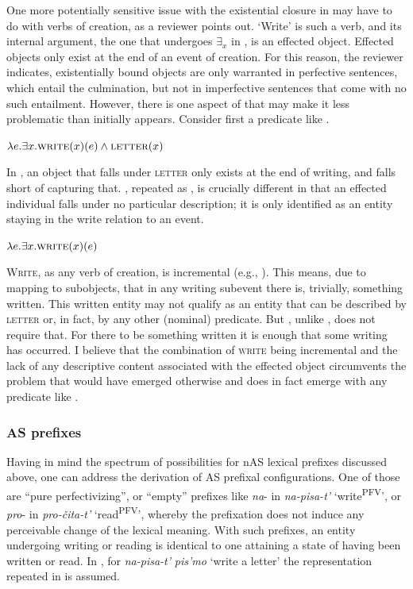\documentclass[output=paper,colorlinks,citecolor=brown]{langscibook}
\begin{document}
One more potentially sensitive issue with the existential closure in  may have to do with verbs of creation, as a reviewer points out. ‘Write’ is such a verb, and its internal argument, the one that undergoes $\exists_x$ in , is an effected object. Effected objects only exist at the end of an event of creation. For this reason, the reviewer indicates, existentially bound objects are only warranted in perfective sentences, which entail the culmination, but not in imperfective sentences that come with no such entailment. However, there is one aspect of  that may make it less problematic than initially appears. Consider first a predicate like .

\ea\label{ex:tatevosov:ifn33}
$\lambda e.\exists x.\textsc{write}(x)(e) \wedge \textsc{letter}(x)$ 
\z

\noindent In , an object that falls under \textsc{letter} only exists at the end of writing, and  falls short of capturing that. , repeated as , is crucially different in that an effected individual falls under no particular description; it is only identified as an entity staying in the write relation to an event.

\ea\label{ex:tatevosov:iifn33}
$\lambda e.\exists x.\textsc{write}(x)(e)$
\z

\noindent \textsc{Write}, as any verb of creation, is incremental (e.g., \citealt{Pinon2008}). This means, due to mapping to subobjects, that in any writing subevent there is, trivially, something written. This written entity may not qualify as an entity that can be described by \textsc{letter} or, in fact, by any other (nominal) predicate. But , unlike , does not require that. For there to be something written it is enough that some writing has occurred. I believe that the combination of \textsc{write} being incremental and the lack of any descriptive content associated with the effected object circumvents the problem that would have emerged otherwise and does in fact emerge with any predicate like .

\subsubsection{AS prefixes}\label{sec:3.3.3}
\hypertarget{RefHeadingToc164647630}{}
Having in mind the spectrum of possibilities for nAS lexical prefixes discussed above, one can address the derivation of AS prefixal configurations. One of those are “pure perfectivizing”, or “empty” prefixes like \textit{na}- in \textit{na-pisa-t’} ‘write\textsuperscript{PFV}’, or \textit{pro}- in \textit{pro-čita-t’} ‘read\textsuperscript{PFV}’, whereby the prefixation does not induce any perceivable change of the lexical meaning. With such prefixes, an entity undergoing writing or reading is identical to one attaining a state of having been written or read. In , for \textit{na-pisa-t’} \textit{pis’mo} ‘write a letter’ the representation repeated in  is assumed.
\end{document}
